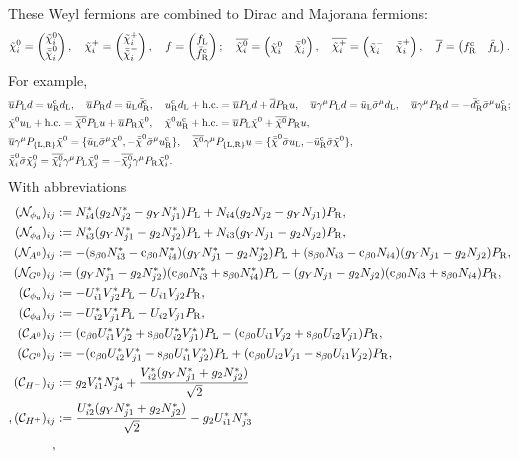 \documentclass[CheatSheet]{subfiles}
\begin{document}
These Weyl fermions are combined to Dirac and Majorana fermions:
\begin{equation}
 \neut[i] = \pmat{\neut[i]\\\bneut[i]},
\quad
 \charP[i] = \pmat{\charP[i]\\\bcharM[i]},
\quad
 f = \pmat{f\w L\\\bar f\w R^{\cc}};
\quad
 \overline{\neut[i]} = \pmat{\neut[i]&\bneut[i]},
\quad
 \overline{\charP[i]} = \pmat{\charM[i]&\bcharP[i]},
\quad
 \overline f = \pmat{f\w R^{\cc}&\bar f\w L}.
\end{equation}
For example,
\begin{align*}
&  \overline{u}\PL d = \uR^\cc\dL,\quad
 \overline{u}\PR d = \buL\bdR^\cc,\quad
\uR^\cc\dL+\text{h.c.} = \overline{u}\PL d + \overline{d}\PR u,\quad
 \overline{u}\gamma^\mu\PL d = \buL\bsigma^\mu\dL,
\quad
 \overline{u}\gamma^\mu\PR d = -\bdR^\cc\bsigma^\mu\uR^\cc;
\\&
\neut\uL +\text{h.c.} = \overline{\neut}\PL u + \overline{u}\PR \neut,\quad
\neut\uR^\cc +\text{h.c.} = \overline{u}\PL\neut + \overline{\neut}\PR u,
\\&
 \overline{u}\gamma^\mu P\w{\{L,R\}}\neut = \{\buL\bsigma^\mu\neut ,-\bneut\bsigma^\mu\uR^\cc\},\quad
 \overline{\neut}\gamma^\mu P\w{\{L,R\}}u = \{\bneut\bsigma\uL, -\buR^\cc\bsigma\neut\},\quad
\\&
\bneut[i]\bsigma\neut[j] = \overline{\neut[i]}\gamma^\mu \PL\neut[j] = -\overline{\neut[j]}\gamma^\mu \PR\neut[i].
\end{align*}
With abbreviations
\begin{align*}
(\mathcal N_{\phi\w u})_{ij} &:= N_{i4}^* (g_2 N_{j2}^*-g_Y N_{j1}^*)\PL  + N_{i4} (g_2 N_{j2}-g_Y N_{j1})\PR,\\
(\mathcal N_{\phi\w d})_{ij} &:= N_{i3}^* (g_Y N_{j1}^*-g_2 N_{j2}^*)\PL  + N_{i3} (g_Y N_{j1}-g_2 N_{j2})\PR,\\
(\mathcal N_{A^0})_{ij}      &:= - (\si{\beta0} N_{i3}^*-\co{\beta0} N_{i4}^*) (g_Y N_{j1}^*-g_2 N_{j2}^*)\PL
  + (\si{\beta0} N_{i3}-\co{\beta0} N_{i4}) (g_Y N_{j1}-g_2 N_{j2})\PR,\\
(\mathcal N_{G^0})_{ij}      &:= (g_Y N_{j1}^*-g_2 N_{j2}^*)(\co{\beta0} N_{i3}^*+\si{\beta0} N_{i4}^*)\PL
  - (g_Y N_{j1}-g_2 N_{j2})(\co{\beta0} N_{i3}+\si{\beta0} N_{i4})\PR,\\
%
(\mathcal C_{\phi\w u})_{ij} &:=- U_{i1}^* V_{j2}^* \PL - U_{i1} V_{j2} \PR,\\
(\mathcal C_{\phi\w d})_{ij} &:=- U_{i2}^* V_{j1}^* \PL - U_{i2} V_{j1} \PR,\\
(\mathcal C_{A^0})_{ij}      &:= (\co{\beta0} U_{i1}^* V_{j2}^*+\si{\beta0} U_{i2}^* V_{j1}^*) \PL -(\co{\beta0} U_{i1}   V_{j2}  +\si{\beta0} U_{i2}   V_{j1})\PR,\\
(\mathcal C_{G^0})_{ij}      &:=-(\co{\beta0} U_{i2}^* V_{j1}^*-\si{\beta0} U_{i1}^* V_{j2}^*) \PL +(\co{\beta0} U_{i2}   V_{j1}  -\si{\beta0} U_{i1}   V_{j2})\PR,\\
(\mathcal C_{H^-})_{ij} &:= g_2 V_{i1}^* N_{j4}^*+\frac{V_{i2}^* (g_Y N_{j1}^*+g_2 N_{j2}^*)}{\sqrt2}\\,
(\mathcal C_{H^+})_{ij} &:=\frac{U_{i2}^* (g_Y N_{j1}^*+g_2 N_{j2}^*)}{\sqrt2}-g_2 U_{i1}^* N_{j3}^*\\,
\end{align*}
\end{document}
